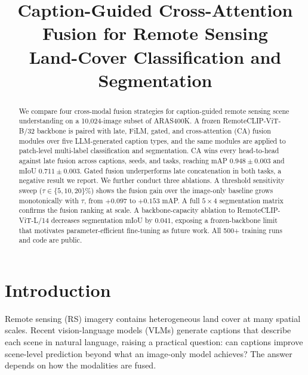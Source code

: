 \documentclass[conference]{IEEEtran}
\begin{document}
\title{\large Caption-Guided Cross-Attention Fusion for Remote Sensing\\Land-Cover Classification and Segmentation}

\author{
}

\maketitle

\begin{abstract}
We compare four cross-modal fusion strategies for caption-guided remote sensing scene understanding on a 10{,}024-image subset of ARAS400K. A frozen RemoteCLIP-ViT-B/32 backbone is paired with late, FiLM, gated, and cross-attention (CA) fusion modules over five LLM-generated caption types, and the same modules are applied to patch-level multi-label classification and segmentation. CA wins every head-to-head against late fusion across captions, seeds, and tasks, reaching mAP $0.948 \pm 0.003$ and mIoU $0.711 \pm 0.003$. Gated fusion underperforms late concatenation in both tasks, a negative result we report. We further conduct three ablations. A threshold sensitivity sweep ($\tau \in \{5, 10, 20\}\%$) shows the fusion gain over the image-only baseline grows monotonically with $\tau$, from $+0.097$ to $+0.153$ mAP. A full $5 \times 4$ segmentation matrix confirms the fusion ranking at scale. A backbone-capacity ablation to RemoteCLIP-ViT-L/14 decreases segmentation mIoU by $0.041$, exposing a frozen-backbone limit that motivates parameter-efficient fine-tuning as future work. All 500+ training runs and code are public.
\end{abstract}

\section{Introduction}

Remote sensing (RS) imagery contains heterogeneous land cover at many spatial scales. Recent vision-language models (VLMs) generate captions that describe each scene in natural language, raising a practical question: can captions improve scene-level prediction beyond what an image-only model achieves? The answer depends on how the modalities are fused.
\end{document}

